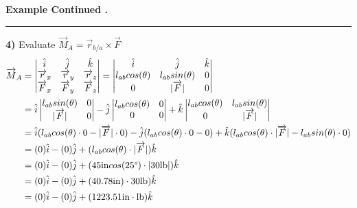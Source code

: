 \documentclass[12pt]{article}
\begin{document}
\newpage
\begin{tcolorbox}[
  standard jigsaw, %
  colframe=fg,
  boxrule=1px,
  colback=black,
  opacityback=0,
  sharp corners,
  coltext=fg
  ]
  \textbf{Example Continued \hfill \thesection.\theexample}
  \vspace{5px}
  \hrule
  \vspace{5px}
  \noindent

  \textbf{4)} Evaluate $\overrightarrow{M}_A = \overrightarrow{r}_{b/a} \times \overrightarrow{F}$
  \begin{align*}
    \overrightarrow{M}_A &=
    \begin{vmatrix}
      \hat{i} & \hat{j} & \hat{k} \\
      \overrightarrow{r}_x & \overrightarrow{r}_y & \overrightarrow{r}_z \\
      \overrightarrow{F}_x & \overrightarrow{F}_y & \overrightarrow{F}_z
    \end{vmatrix}
    =
    \begin{vmatrix}
      \hat{i} & \hat{j} & \hat{k} \\
      l_{ab}cos(\theta) & l_{ab}sin(\theta) & 0 \\
      0 & |\overrightarrow{F}| & 0
    \end{vmatrix} \\
    &= \hat{i}
    \begin{vmatrix}
      l_{ab}sin(\theta) & 0 \\
      |\overrightarrow{F}| & 0
    \end{vmatrix}
    - \hat{j}
    \begin{vmatrix}
      l_{ab}cos(\theta) & 0 \\
      0 & 0
    \end{vmatrix}
    + \hat{k}
    \begin{vmatrix}
      l_{ab}cos(\theta) & l_{ab}sin(\theta) \\
      0 & |\overrightarrow{F}|
    \end{vmatrix} \\
    &= \hat{i}(l_{ab}cos(\theta) \cdot 0 - |\overrightarrow{F}| \cdot 0) - \hat{j}(l_{ab}cos(\theta) \cdot 0 - 0) + \hat{k}(l_{ab}cos(\theta) \cdot |\overrightarrow{F}| - l_{ab}sin(\theta) \cdot 0) \\
    &= (0)\hat{i} - (0)\hat{j} + (l_{ab}cos(\theta) \cdot |\overrightarrow{F}|)\hat{k} \\
    &= (0)\hat{i} - (0)\hat{j} + (45\textup{in}cos(25\degree) \cdot |30\textup{lb}|)\hat{k} \\
    &= (0)\hat{i} - (0)\hat{j} + (40.78\textup{in}) \cdot 30\textup{lb})\hat{k} \\
    &= (0)\hat{i} - (0)\hat{j} + (1223.51\textup{in} \cdot \textup{lb})\hat{k}
  \end{align*}


\end{tcolorbox}
\end{document}
